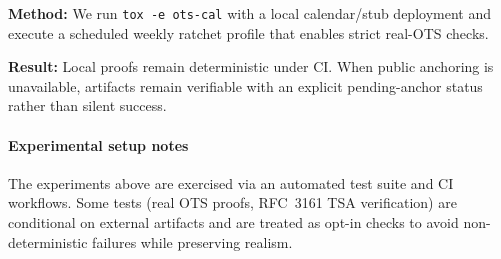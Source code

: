\textbf{Method:} We run \texttt{tox -e ots-cal} with a local calendar/stub deployment and execute a scheduled weekly ratchet profile that enables strict real-\ac{OTS} checks.

\textbf{Result:} Local proofs remain deterministic under \ac{CI}.
When public anchoring is unavailable, artifacts remain verifiable with an explicit pending-anchor status rather than silent success.

\paragraph{Experimental setup notes}
The experiments above are exercised via an automated test suite and \ac{CI} workflows.
Some tests (real \ac{OTS} proofs, \ac{RFC}~3161 \ac{TSA} verification) are conditional on external artifacts and are treated as opt-in checks to avoid non-deterministic failures while preserving realism.
